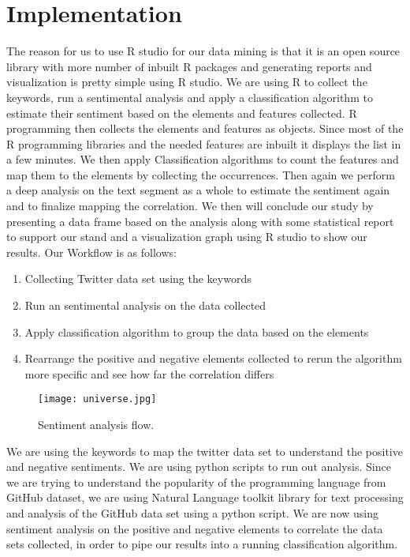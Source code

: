 \documentclass{sig-alternate}
\begin{document}
\section{Implementation}
\label{implementation}
The reason for us to use R studio for our data mining is that it is an open source library with more number of inbuilt R packages and generating reports and visualization is pretty simple using R studio. We are using R to collect the keywords, run a sentimental analysis and apply a classification algorithm to estimate their sentiment based on the elements and features collected. R programming then collects the elements and features as objects. Since most of the R programming libraries and the needed features are inbuilt it displays the list in a few minutes. We then apply Classification algorithms to count the features and map them to the elements by collecting the occurrences. Then again we perform a deep analysis on the text segment as a whole to estimate the sentiment again and to finalize mapping the correlation. We then will conclude our study by presenting a data frame based on the analysis along with some statistical report to support our stand and a visualization graph using R studio to show our results. Our Workflow is as follows:

\begin{enumerate}
  \item Collecting Twitter data set using the keywords
  \item Run an sentimental analysis on the data collected
  \item Apply classification algorithm to group the data based on the elements
  \item Rearrange the positive and negative elements collected to rerun the algorithm more specific and see how far the correlation differs
\end{enumerate}

\begin{figure}[ht!]
\centering
\texttt{[image: universe.jpg]}
\caption{Sentiment analysis flow. \label{overflow}}
\end{figure}

We are using the keywords to map the twitter data set to understand the positive and negative sentiments. We are using python scripts to run out analysis. Since we are trying to understand the popularity of the programming language from GitHub dataset, we are using Natural Language toolkit library for text processing and analysis of the GitHub data set using a python script. We are now using sentiment analysis on the positive and negative elements to correlate the data sets collected, in order to pipe our results into a running classification algorithm. 
\end{document}
